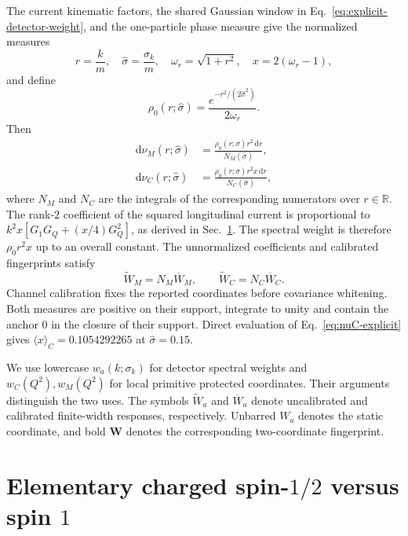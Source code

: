 \documentclass[12pt]{iopjournal}
\newcommand{\dd}{\mathrm d}
\theoremstyle{definition}
\theoremstyle{remark}
\begin{document}
The current kinematic factors, the shared Gaussian window in Eq.~\eqref{eq:explicit-detector-weight}, and the one-particle phase measure give the normalized measures
\begin{equation}
r=\frac{k}{m},\quad \widehat\sigma=\frac{\sigma_k}{m},\quad
\omega_r=\sqrt{1+r^2},\quad x=2(\omega_r-1),
\end{equation}
and define
\begin{equation}
\rho_0(r;\widehat\sigma)
=\frac{e^{-r^2/(2\widehat\sigma^2)}}{2\omega_r}.
\end{equation}
Then
\begin{align}
\dd\nu_M(r;\widehat\sigma)
&=\frac{\rho_0(r;\widehat\sigma)r^2\,\dd r}{N_M(\widehat\sigma)},
\label{eq:nuM-explicit}\\
\dd\nu_C(r;\widehat\sigma)
&=\frac{\rho_0(r;\widehat\sigma)r^2 x\,\dd r}
{N_C(\widehat\sigma)},
\label{eq:nuC-explicit}
\end{align}
where $N_M$ and $N_C$ are the integrals of the corresponding numerators over $r\in\mathbb R$. The rank-$2$ coefficient of the squared longitudinal current is proportional to $k^2x[G_1G_Q+(x/4)G_Q^2]$, as derived in Sec.~\ref{sec:half-one}. The spectral weight is therefore $\rho_0r^2x$ up to an overall constant. The unnormalized coefficients and calibrated fingerprints satisfy
\begin{equation}
\widetilde W_M=N_M\overline W_M,
\qquad
\widetilde W_C=N_C\overline W_C.
\label{eq:channel-calibration}
\end{equation}
Channel calibration fixes the reported coordinates before covariance whitening. Both measures are positive on their support, integrate to unity and contain the anchor $0$ in the closure of their support. Direct evaluation of Eq.~\eqref{eq:nuC-explicit} gives $\langle x\rangle_C=0.1054292265$ at $\widehat\sigma=0.15$.

We use lowercase $w_a(k;\sigma_k)$ for detector spectral weights and $w_C(Q^2),w_M(Q^2)$ for local primitive protected coordinates. Their arguments distinguish the two uses. The symbols $\widetilde W_a$ and $\overline W_a$ denote uncalibrated and calibrated finite-width responses, respectively. Unbarred $W_a$ denotes the static coordinate, and bold $\bm W$ denotes the corresponding two-coordinate fingerprint.

\section{Elementary charged spin-$1/2$ versus spin $1$}
\label{sec:half-one}
\end{document}

